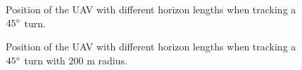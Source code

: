 \begin{figure}
	\centering
	\caption{Position of the UAV with different horizon lengths when tracking a $45\degree$ turn.}
	\label{fig:lin_45deg_uav_position}
\end{figure}

\begin{figure}
	\centering
	\caption{Position of the UAV with different horizon lengths when tracking a $45\degree$ turn with $200$ m radius.}
	\label{fig:cur_45deg_200m_uav_position}
\end{figure}

